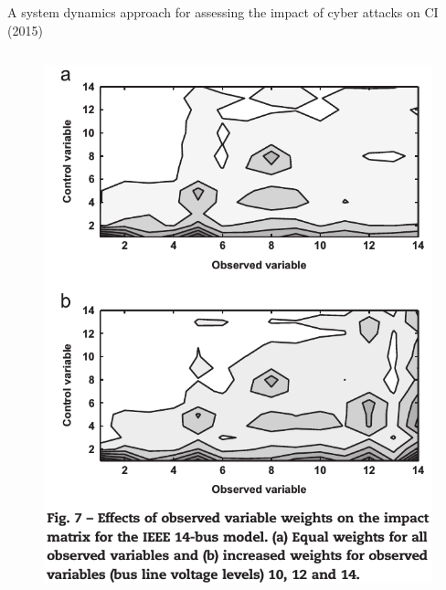 \documentclass[compress]{beamer}
\begin{document}
\begin{frame}{A system dynamics approach for assessing the impact of cyber attacks on CI (2015)}
\begin{columns}
\begin{column}{0.45\textwidth}
\begin{figure}
      \includegraphics[width=1.0\textwidth]{./images/caia-param.png}
      \label{fig:caia-param}
      \end{figure}
     \end{column}
    \end{columns}
\end{frame}
\end{document}
